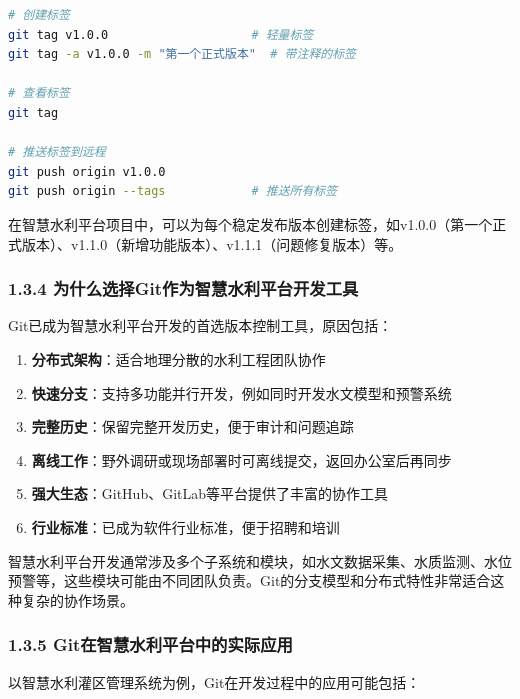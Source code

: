 \begin{lstlisting}[language=bash]
# 创建标签
git tag v1.0.0                    # 轻量标签
git tag -a v1.0.0 -m "第一个正式版本"  # 带注释的标签

# 查看标签
git tag

# 推送标签到远程
git push origin v1.0.0
git push origin --tags            # 推送所有标签
\end{lstlisting}

在智慧水利平台项目中，可以为每个稳定发布版本创建标签，如v1.0.0（第一个正式版本）、v1.1.0（新增功能版本）、v1.1.1（问题修复版本）等。

\subsubsection{1.3.4
为什么选择Git作为智慧水利平台开发工具}\label{ux4e3aux4ec0ux4e48ux9009ux62e9gitux4f5cux4e3aux667aux6167ux6c34ux5229ux5e73ux53f0ux5f00ux53d1ux5de5ux5177}

Git已成为智慧水利平台开发的首选版本控制工具，原因包括：

\begin{enumerate}
\def\labelenumi{\arabic{enumi}.}
\tightlist
\item
  \textbf{分布式架构}：适合地理分散的水利工程团队协作
\item
  \textbf{快速分支}：支持多功能并行开发，例如同时开发水文模型和预警系统
\item
  \textbf{完整历史}：保留完整开发历史，便于审计和问题追踪
\item
  \textbf{离线工作}：野外调研或现场部署时可离线提交，返回办公室后再同步
\item
  \textbf{强大生态}：GitHub、GitLab等平台提供了丰富的协作工具
\item
  \textbf{行业标准}：已成为软件行业标准，便于招聘和培训
\end{enumerate}

智慧水利平台开发通常涉及多个子系统和模块，如水文数据采集、水质监测、水位预警等，这些模块可能由不同团队负责。Git的分支模型和分布式特性非常适合这种复杂的协作场景。

\subsubsection{1.3.5
Git在智慧水利平台中的实际应用}\label{gitux5728ux667aux6167ux6c34ux5229ux5e73ux53f0ux4e2dux7684ux5b9eux9645ux5e94ux7528}

以智慧水利灌区管理系统为例，Git在开发过程中的应用可能包括：


